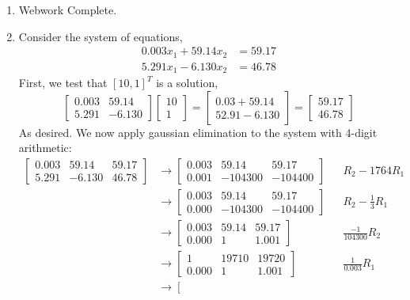 \documentclass[letterpaper,10pt]{article}
\begin{document}
\begin{enumerate}
\item Webwork Complete.
\item Consider the system of equations,
\begin{align*}
0.003x_1+59.14x_2 &= 59.17\\
5.291x_1-6.130x_2 &= 46.78
\end{align*}
First, we test that $[10,1]^T$ is a solution,
\[\begin{bmatrix}
0.003 & 59.14\\ 5.291 & -6.130
\end{bmatrix}\begin{bmatrix}
10\\1
\end{bmatrix}=\begin{bmatrix}
0.03+59.14\\52.91-6.130
\end{bmatrix}=\begin{bmatrix}
59.17\\46.78
\end{bmatrix} \]
As desired. We now apply gaussian elimination to the system with 4-digit arithmetic:
\begin{align*}
\left[\begin{array}{cc|c}
0.003 & 59.14 & 59.17\\ 5.291 & -6.130 & 46.78
\end{array}\right] &\to \left[\begin{array}{cc|c}
0.003 & 59.14 & 59.17\\ 0.001 & -104300 & -104400
\end{array}\right] && R_2-1764R_1\\
&\to \left[\begin{array}{cc|c}
0.003 & 59.14 & 59.17\\ 0.000 & -104300 & -104400
\end{array}\right] && R_2-\frac{1}{3}R_1\\
&\to \left[\begin{array}{cc|c}
0.003 & 59.14 & 59.17\\ 0.000 & 1 & 1.001
\end{array}\right] && \frac{-1}{104300}R_2\\
&\to \left[\begin{array}{cc|c}
1 & 19710 & 19720\\ 0.000 & 1 & 1.001
\end{array}\right] && \frac{1}{0.003}R_1\\
&\to \left[\begin{array}{cc|c}

\end{array}
\end{align*}
\end{enumerate}
\end{document}
